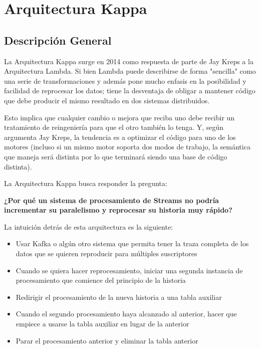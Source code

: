\section{Arquitectura Kappa}

\subsection{Descripción General}

La Arquitectura Kappa surge en 2014 como respuesta de parte de Jay Kreps a la Arquitectura Lambda. 
Si bien Lambda puede describirse de forma "sencilla" como una serie de transformaciones y además pone 
mucho enfasis en la posibilidad y facilidad de reprocesar los datos; 
tiene la desventaja de obligar a mantener código que debe producir el mismo resultado en dos sistemas
distribuidos. \newline 

Esto implica que cualquier cambio o mejora que reciba uno debe recibir un tratamiento
de reingeniería para que el otro también lo tenga. Y, según argumenta Jay Kreps, la tendencia es a 
optimizar el código para uno de los motores (incluso si un mismo motor soporta dos modos de trabajo, 
la semántica que maneja será distinta por lo que terminará siendo una base de código distinta). \parencite{kreps2014questioning}\newline

La Arquitectura Kappa busca responder la pregunta: \newline

\textbf{¿Por qué un sistema de procesamiento de Streams no podría incrementar su paralelismo y reprocesar su historia muy rápido?}   
\newline

La intuición detrás de esta arquitectura es la siguiente: 

\begin{itemize}
    \item Usar Kafka o algún otro sistema que permita tener la traza completa de los datos que se quieren reproducir para múltiples suscriptores
    \item Cuando se quiera hacer reprocesamiento, iniciar una segunda instancia de procesamiento que comience del principio de la historia
    \item Redirigir el procesamiento de la nueva historia a una tabla auxiliar
    \item Cuando el segundo procesamiento haya alcanzado al anterior, hacer que empiece a usarse la tabla auxiliar en lugar de la anterior
    \item Parar el procesamiento anterior y eliminar la tabla anterior
\end{itemize}

